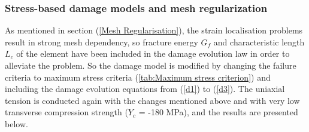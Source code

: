\documentclass[12pt,a4paper,twoside,openright]{report}
\begin{document}
\subsubsection{Stress-based damage models and mesh regularization}
\indent\indent\indent As mentioned in section (\ref{Mesh Regularisation}), the strain localisation problems result in strong mesh dependency, so fracture energy $G_f$ and characteristic length $L_{c}$ of the element have been included in the damage evolution law in order to alleviate the problem. So the damage model is modified by changing the failure criteria to maximum stress criteria (\ref{tab:Maximum stress criterion}) and including the damage evolution equations from (\ref{d1}) to (\ref{d3}). The uniaxial tension is conducted again with the changes mentioned above and with very low transverse compression strength ($Y_{c}$ = -180 MPa), and the results are presented below.
\end{document}
